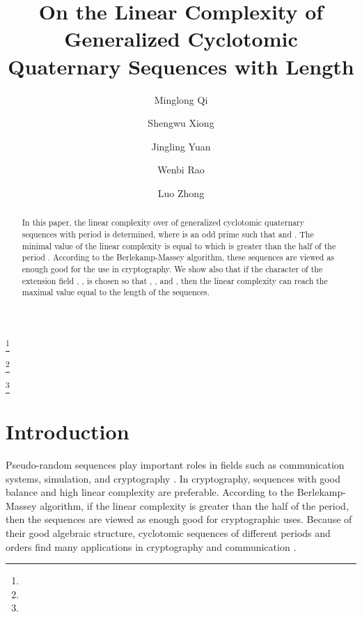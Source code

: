 \documentclass{mcom-l}
\theoremstyle{definition}
\numberwithin{equation}{section}
\begin{document}
\title[Linear Complexity of Generalized Cyclotomic Quaternary Sequences ]{On the Linear Complexity of Generalized Cyclotomic Quaternary Sequences with Length }


\author{Minglong Qi}
\address{School of Computer Science and Technology, Wuhan University of Technology, Mafangshan West Campus, 430070 Wuhan City, China}
\curraddr{}


\author{Shengwu Xiong}
\address{}
\curraddr{}
\email{}


\author{Jingling Yuan}
\address{}
\curraddr{}
\email{}
\thanks{}

\author{Wenbi Rao}
\address{}
\curraddr{}
\email{}
\thanks{}

\author{Luo Zhong}
\address{}
\curraddr{}
\email{}
\thanks{}





\begin{abstract}
In this paper, the linear complexity over    of   generalized cyclotomic quaternary sequences with period   is determined, where  is an odd prime such that  and . The minimal value of the linear complexity  is equal to  which is greater than  the half of the period . According to the Berlekamp-Massey algorithm, these sequences are viewed as enough good for the use in cryptography. We show also that if the character of the extension field , , is chosen so that  , , and , then the linear complexity can reach the maximal value equal to the length of the sequences.
\end{abstract}
\maketitle
\section{Introduction}
\label{sec1}
Pseudo-random sequences play important roles in fields such as communication systems, simulation, and cryptography \cite{B1,B2}. In  cryptography, sequences with good balance and high linear complexity are preferable\cite{B2,B3,B4}. According to the Berlekamp-Massey algorithm\cite{B5}, if the linear complexity is greater than the half of the period, then the sequences are viewed as enough good for cryptographic uses. Because of their  good algebraic structure\cite{B6,B8}, cyclotomic sequences of different periods and orders find many applications in cryptography and communication \cite{B4,B7,B8,B9,B10}.
\end{document}
